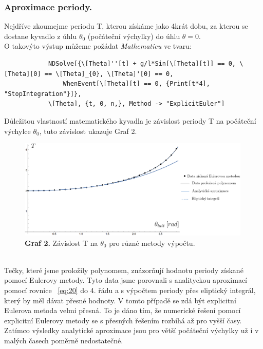 \documentclass[reqno, a4paper]{amsart}
\begin{document}
		\subsubsection{Aproximace periody.} Nejdříve zkoumejme periodu T, kterou získáme jako 4krát dobu, za kterou se dostane kyvadlo z úhlu $\theta_{0}$ (počáteční výchylky) do úhlu $\theta=0$. 
		\\
		O takovýto výstup můžeme požádat \textit{Mathematicu} ve tvaru:  
		\begin{verbatim}
			NDSolve[{\[Theta]''[t] + g/l*Sin[\[Theta][t]] == 0, \[Theta][0] == \[Theta]_{0}, \[Theta]'[0] == 0, 
				WhenEvent[\[Theta][t] == 0, {Print[t*4], "StopIntegration"}]}, 
			\[Theta], {t, 0, n,}, Method -> "ExplicitEuler"]
		\end{verbatim}
		Důležitou vlastností matematického kyvadla je závislost periody T na počáteční výchylce $\theta_{0}$, tuto závislost ukazuje Graf 2.
		\begin{figure}[h]
			\centering
			\includegraphics[width=0.99\textwidth]{graf1}
			\caption*{\textbf{Graf 2.} Závislost T na $\theta_{0}$ pro různé metody výpočtu.}  
		\end{figure}
		\\
		Tečky, které jsme proložily polynomem, znázorňují hodnotu periody získané pomocí Eulerovy metody. Tyto data jsme porovnali s analityckou aproximací pomocí rovnice ~\eqref{eq:20} do 4. řádu a s výpočtem periody přes eliptický integrál, který by měl dávat přesné hodnoty.
		V tomto případě se zdá být explicitní Eulerova metoda velmi přesná. To je dáno tím, že numerické řešení pomocí explicitní Eulerovy metody se s přesných řešením rozbíhá až pro vyšší časy. Zatímco výsledky analytické aproximace jsou pro větší počáteční výchylky už i v malých časech poměrně nedostatečné.
		\\
		\\
\end{document}

